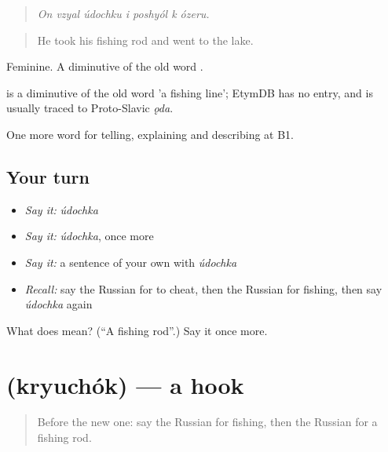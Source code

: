 \begin{quote}
\emph{On vzyal údochku i poshyól k ózeru.}
\end{quote}

\begin{quote}
He took his fishing rod and went to the lake.
\end{quote}

Feminine. A diminutive of the old word \emph{}.

\begin{cousinweb}
\emph{} is a diminutive of the old word \emph{} 'a fishing line'; EtymDB has no entry, and \emph{} is usually traced to Proto-Slavic \emph{ǫda}.
\end{cousinweb}

\begin{grammarlens}[title={What you've built}]
One more word for telling, explaining and describing at B1.
\end{grammarlens}

\subsection*{Your turn}
\begin{itemize}
\raggedright
  \item \emph{Say it:} \emph{údochka}
  \item \emph{Say it:} \emph{údochka}, once more
  \item \emph{Say it:} a sentence of your own with \emph{údochka}
  \item \emph{Recall:} say the Russian for to cheat, then the Russian for fishing, then say \emph{údochka} again
\end{itemize}

\begin{tcolorbox}[breakable,colback=teal!4,colframe=teal!35!black,title={Before you move on}]
What does  mean? (\textquotedblleft{}A fishing rod\textquotedblright{}.) Say it once more.
\end{tcolorbox}
\section[\texorpdfstring{\ru{крючок} (kryuchók)}{крючок (kryuchók)}]{ (kryuchók) — a hook}

\label{lesson:RU-C505-kryuchok}



\begin{quote}
Before the new one: say the Russian for fishing, then the Russian for a fishing rod.
\end{quote}

